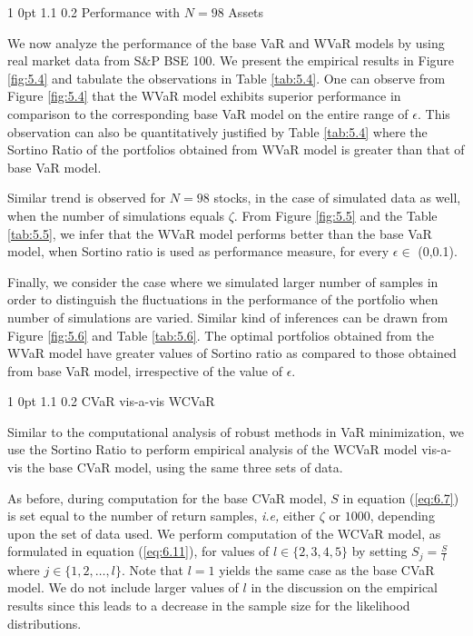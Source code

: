\documentclass[12pt]{article}
\makeatletter
\numberwithin{equation}{section}
\renewcommand{\subsection}{
  \@startsection
  {subsection}%
  {1}%
  {0pt}%
  {1.1\baselineskip}%
  {0.2\baselineskip}%
  {\sc \centering}%
}
\renewcommand{\subsubsection}{
  \@startsection
  {subsubsection}%
  {1}%
  {0pt}%
  {1.1\baselineskip}%
  {0.2\baselineskip}%
  {\sc \centering}%
}
\makeatother
\begin{document}
\subsubsection{Performance with $N=98$ Assets}

We now analyze the performance of the base VaR and WVaR models by using real market data from S\&P BSE 100. We present the empirical results in Figure \ref{fig:5.4} and tabulate the observations in Table \ref{tab:5.4}. One can observe from Figure \ref{fig:5.4} that the WVaR model exhibits superior performance in comparison to the corresponding base VaR model on the entire range of $\epsilon$. This observation can also be quantitatively justified by Table \ref{tab:5.4} where the Sortino Ratio of the portfolios obtained from WVaR model is greater than that of base VaR model.

Similar trend is observed for $N=98$ stocks, in the case of simulated data as well, when the number of simulations equals $\zeta$. From Figure \ref{fig:5.5} and the Table \ref{tab:5.5}, we infer that the WVaR model performs better than the base VaR model, when Sortino ratio is used as performance measure, for every $\epsilon \in$ (0,0.1).

Finally, we consider the case where we simulated larger number of samples in order to distinguish the fluctuations in the performance of the portfolio when number of simulations are varied. Similar kind of inferences can be drawn from Figure \ref{fig:5.6} and Table \ref{tab:5.6}. The optimal portfolios obtained from the WVaR model have greater values of Sortino ratio as compared to those obtained from base VaR model, irrespective of the value of $\epsilon$.

\subsection{CVaR vis-a-vis WCVaR}

Similar to the computational analysis of robust methods in VaR minimization, we use the Sortino Ratio to perform empirical analysis of the WCVaR model vis-a-vis the base CVaR model,
using the same three sets of data.

As before, during computation for the base CVaR model, $S$ in equation (\ref{eq:6.7}) is set equal to the number of return samples, \textit{i.e,} either $\zeta$ or $1000$, depending upon the set of data used. We perform computation of the WCVaR model, as formulated in equation (\ref{eq:6.11}), for values of
$l \in \{2,3,4,5\}$ by setting $\displaystyle{S_{j}=\frac{S}{l}}$ where $\displaystyle{j \in \{1,2,\dots,l\}}$. Note that $l=1$ yields the same case as the base CVaR model. We do not include larger values of $l$ in the discussion on the empirical results since this leads to a decrease in the sample size for the likelihood distributions.
\end{document}

